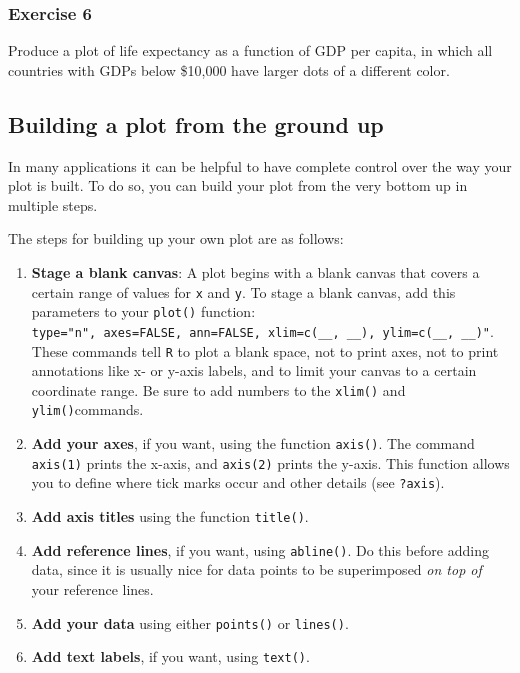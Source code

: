\documentclass[
]{book}
\begin{document}
\hypertarget{exercise-6-1}{%
\subsubsection*{Exercise 6}\label{exercise-6-1}}

Produce a plot of life expectancy as a function of GDP per capita, in which all countries with GDPs below \$10,000 have larger dots of a different color.

\hypertarget{building-a-plot-from-the-ground-up}{%
\subsection*{Building a plot from the ground up}\label{building-a-plot-from-the-ground-up}}

In many applications it can be helpful to have complete control over the way your plot is built. To do so, you can build your plot from the very bottom up in multiple steps.

The steps for building up your own plot are as follows:

\begin{enumerate}
\def\labelenumi{\arabic{enumi}.}
\item
  \textbf{Stage a blank canvas}: A plot begins with a blank canvas that covers a certain range of values for \texttt{x} and \texttt{y}. To stage a blank canvas, add this parameters to your \texttt{plot()} function: \texttt{type="n",\ axes=FALSE,\ ann=FALSE,\ xlim=c(\_\_,\ \_\_),\ ylim=c(\_\_,\ \_\_)"}. These commands tell \texttt{R} to plot a blank space, not to print axes, not to print annotations like x- or y-axis labels, and to limit your canvas to a certain coordinate range. Be sure to add numbers to the \texttt{xlim()} and \texttt{ylim()}commands.
\item
  \textbf{Add your axes}, if you want, using the function \texttt{axis()}. The command \texttt{axis(1)} prints the x-axis, and \texttt{axis(2)} prints the y-axis. This function allows you to define where tick marks occur and other details (see \texttt{?axis}).
\item
  \textbf{Add axis titles} using the function \texttt{title()}.
\item
  \textbf{Add reference lines}, if you want, using \texttt{abline()}. Do this before adding data, since it is usually nice for data points to be superimposed \emph{on top of} your reference lines.
\item
  \textbf{Add your data} using either \texttt{points()} or \texttt{lines()}.
\item
  \textbf{Add text labels}, if you want, using \texttt{text()}.
\end{enumerate}
\end{document}
